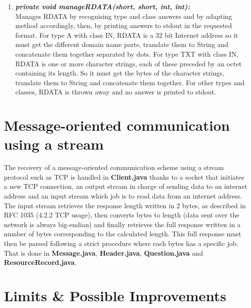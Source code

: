 \documentclass[a4paper, 11pt]{article}
\begin{document}
\begin{enumerate}
\begin{enumerate}
            \item \textbf{\textit{private void manageRDATA(short, short, int, int):}}\\ Manages RDATA by recognising type and class answers and by adapting method accordingly, then, by printing answers to stdout in the requested format. For type A with class IN, RDATA is a 32 bit Internet address so it must get the different domain name parts, translate them to String and concatenate them together separated by dots. For type TXT with class IN, RDATA is one or more character strings, each of these preceded by an octet containing its length. So it must get the bytes of the character strings, translate them to String and concatenate them together. For other types and classes, RDATA is thrown away and no answer is printed to stdout.
        \end{enumerate}
        
\end{enumerate}


\section{Message-oriented communication using a stream}
The recovery of a message-oriented communication scheme using a stream protocol such as TCP is handled in \textbf{Client.java} thanks to a socket that initiates a new TCP connection, an output stream in charge of sending data to an internet address and an input stream which job is to read data from an internet address. The input stream retrieves the response length written in 2 bytes, as described in RFC 1035 (4.2.2 TCP usage), then converts bytes to length (data sent over the network is always big-endian) and finally retrieves the full response written in a number of bytes corresponding to the calculated length. This full response must then be parsed following a strict procedure where each bytes has a specific job. That is done in \textbf{Message.java}, \textbf{Header.java}, \textbf{Question.java} and \textbf{ResourceRecord.java}.

\section{Limits \& Possible Improvements}
\end{document}
